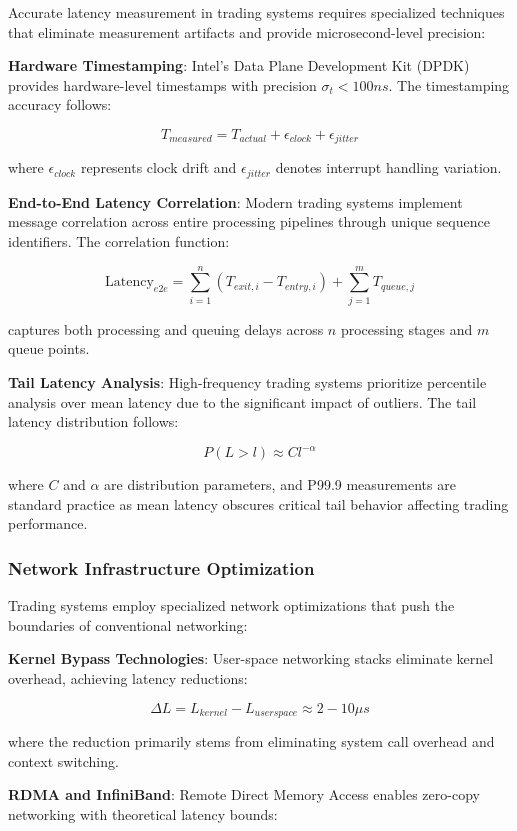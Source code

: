 \documentclass[12pt,a4paper]{article}
\begin{document}
Accurate latency measurement in trading systems requires specialized techniques that eliminate measurement artifacts and provide microsecond-level precision:

\textbf{Hardware Timestamping}: Intel's Data Plane Development Kit (DPDK) \cite{intel2023dpdk} provides hardware-level timestamps with precision $\sigma_t < 100ns$. The timestamping accuracy follows:

$$T_{measured} = T_{actual} + \epsilon_{clock} + \epsilon_{jitter}$$

where $\epsilon_{clock}$ represents clock drift and $\epsilon_{jitter}$ denotes interrupt handling variation.

\textbf{End-to-End Latency Correlation}: Modern trading systems implement message correlation across entire processing pipelines through unique sequence identifiers. The correlation function:

$$\text{Latency}_{e2e} = \sum_{i=1}^{n} (T_{exit,i} - T_{entry,i}) + \sum_{j=1}^{m} T_{queue,j}$$

captures both processing and queuing delays across $n$ processing stages and $m$ queue points.

\textbf{Tail Latency Analysis}: High-frequency trading systems prioritize percentile analysis over mean latency due to the significant impact of outliers. The tail latency distribution follows:

$$P(L > l) \approx Cl^{-\alpha}$$

where $C$ and $\alpha$ are distribution parameters, and P99.9 measurements are standard practice as mean latency obscures critical tail behavior affecting trading performance.

\subsubsection{Network Infrastructure Optimization}

Trading systems employ specialized network optimizations that push the boundaries of conventional networking:

\textbf{Kernel Bypass Technologies}: User-space networking stacks eliminate kernel overhead, achieving latency reductions:

$$\Delta L = L_{kernel} - L_{userspace} \approx 2-10\mu s$$

where the reduction primarily stems from eliminating system call overhead and context switching.

\textbf{RDMA and InfiniBand}: Remote Direct Memory Access enables zero-copy networking with theoretical latency bounds:
\end{document}

